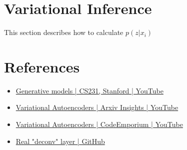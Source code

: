 \section{Variational Inference}
This section describes how to calculate $p(z|x_i)$

\section{References}
\begin{itemize}
	\item \href{https://www.youtube.com/watch?v=5WoItGTWV54}{Generative models | CS231, Stanford | YouTube}
	\item \href{https://www.youtube.com/watch?v=9zKuYvjFFS8}{Variational Autoencoders | Arxiv Insights | YouTube}
	\item \href{https://www.youtube.com/watch?v=fcvYpzHmhvA}{Variational Autoencoders | CodeEmporium | YouTube}
	\item \href{https://github.com/vdumoulin/conv_arithmetic}{Real "deconv" layer | GitHub}
\end{itemize}